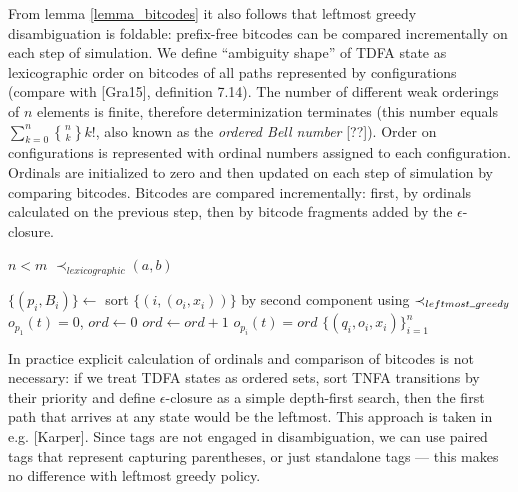 \documentclass{article}
\newcommand{\Xset}{\!\leftarrow\!}
\newcommand{\Xund}{\rule{.4em}{.4pt}} %
\newcommand{\Xeq}{\!=\!}
\newcommand{\Xstirling}[2]{\genfrac{\{}{\}}{0pt}{}{#1}{#2}}
\theoremstyle{definition}
\begin{document}
\begin{multicols}{2}
From lemma \ref{lemma_bitcodes} it also follows that leftmost greedy disambiguation is foldable:
prefix-free bitcodes can be compared incrementally on each step of simulation.
We define ``ambiguity shape'' of TDFA state as lexicographic order on bitcodes of all paths represented by configurations
(compare with [Gra15], definition 7.14).
The number of different weak orderings of $n$ elements is finite, therefore determinization terminates
(this number equals $\sum_{k=0}^n \Xstirling{n}{k} k!$, also known as the \emph{ordered Bell number} [??]).
Order on configurations is represented with ordinal numbers assigned to each configuration.
Ordinals are initialized to zero and then updated on each step of simulation by comparing bitcodes.
Bitcodes are compared incrementally:
first, by ordinals calculated on the previous step, then by bitcode fragments added by the $\epsilon$-closure.
\\

    \begin{algorithm}[H] \DontPrintSemicolon {} 
    \Fn {$\underline{\prec_{leftmost \Xund greedy} ((n, a), (m, b))} \smallskip$} {
         {\Return $n \!<\! m$}
        \Return $\prec_{lexicographic} (a, b)$ \;
    }
    \end{algorithm}


    \begin{algorithm}[H] \DontPrintSemicolon {}   
     {
        $\{(p_i, B_i)\} \Xset $ sort $\{(i, (o_i, x_i))\}$ by second component using $\prec_{leftmost \Xund greedy}$ \;
        \Let $o_{p_1}(t) \Xeq 0$, $ord \Xset 0$ \;
        \For {$i \Xeq \overline{2, n}$} {
             {$ord \Xset ord \!+\! 1$}
            \Let $o_{p_i}(t) \Xeq ord$ \;
        }
        \Return $\{(q_i, o_i, x_i)\}_{i=1}^n$ \;
    }
    \end{algorithm}

In practice explicit calculation of ordinals and comparison of bitcodes is not necessary:
if we treat TDFA states as ordered sets,
sort TNFA transitions by their priority
and define $\epsilon$-closure as a simple depth-first search,
then the first path that arrives at any state would be the leftmost.
This approach is taken in e.g. [Karper].
Since tags are not engaged in disambiguation,
we can use paired tags that represent capturing parentheses, or just standalone tags --- this makes no difference with leftmost greedy policy.


\end{multicols}
\end{document}

